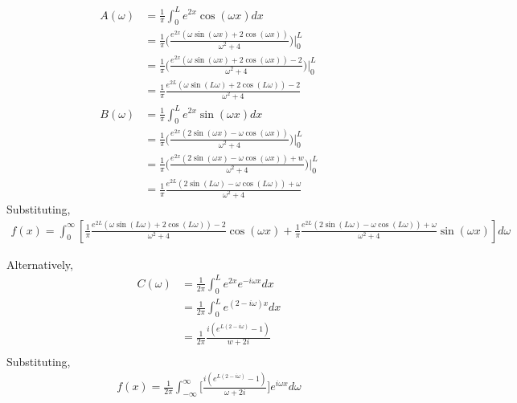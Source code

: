 \documentclass[12pt]{article}
\begin{document}
\begin{align*}
  A(\omega) &= \frac{1}{\pi} \int_0^L e^{2x}\cos(\omega x) dx \\
  &= \frac{1}{\pi} \bigg( \frac{e^{2x}(\omega \sin(\omega x) + 2\cos(\omega x))}{\omega^2 + 4} \bigg) \bigg|_0^L \\
  &= \frac{1}{\pi} \bigg( \frac{e^{2x}(\omega \sin(\omega x) + 2\cos(\omega x)) - 2}{\omega^2 + 4} \bigg) \bigg|_0^L \\
  &= \frac{1}{\pi} \frac{e^{2L}(\omega \sin(L\omega) + 2\cos(L\omega)) - 2}{\omega^2 + 4} \tag{1 mark} \\
  B(\omega) &= \frac{1}{\pi} \int_0^L e^{2x}\sin(\omega x) dx \\
  &= \frac{1}{\pi} \bigg( \frac{e^{2x}(2\sin(\omega x) - \omega \cos(\omega x))}{\omega^2 + 4} \bigg) \bigg|_0^L \\
  &= \frac{1}{\pi} \bigg( \frac{e^{2x}(2\sin(\omega x) - \omega \cos(\omega x)) + w}{\omega^2 + 4} \bigg) \bigg|_0^L \\
  &= \frac{1}{\pi} \frac{e^{2L}(2\sin(L\omega) - \omega \cos(L\omega)) + \omega}{\omega^2 + 4} \tag{1 mark}
\end{align*}
Substituting,
\begin{align*}
    f(x) = \int_0^{\infty}[\frac{1}{\pi} \frac{e^{2L}(\omega \sin(L\omega) + 2\cos(L\omega)) - 2}{\omega^2 + 4}\cos(\omega x) + \frac{1}{\pi} \frac{e^{2L}(2\sin(L\omega) - \omega \cos(L\omega)) + \omega}{\omega^2 + 4}\sin(\omega x)] d\omega \tag{1 mark}
\end{align*}

\noindent Alternatively,
\begin{align*}
  C(\omega) &= \frac{1}{2\pi} \int_{0}^{L}e^{2x}e^{-i\omega x} dx \\
  &= \frac{1}{2\pi} \int_{0}^{L}e^{(2-i\omega)x} dx \\
  &= \frac{1}{2\pi} \frac{i(e^{L(2 - i\omega)} - 1)}{w + 2i} \tag {2 marks} \\
\end{align*}
Substituting,
\begin{align*}
    f(x) = \frac{1}{2\pi} \int_{-\infty}^{\infty} \bigg[ \frac{i(e^{L(2 - i\omega)} - 1)}{\omega + 2i} \bigg] e^{i\omega x} d\omega \tag{1 mark}
\end{align*}
\end{document}
